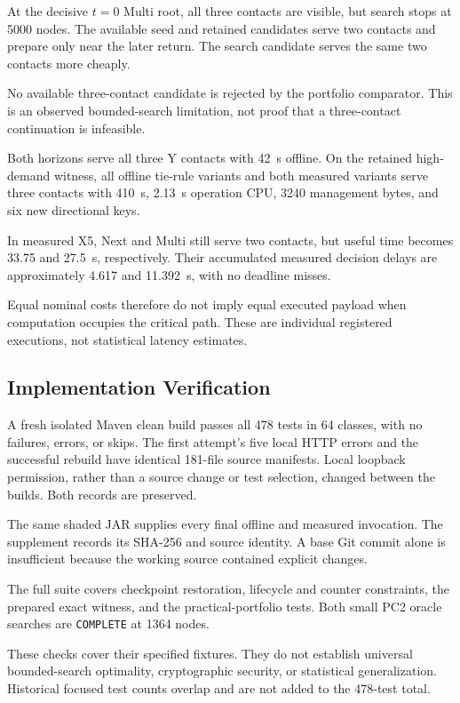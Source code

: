 \documentclass[conference]{IEEEtran}
\newcommand{\op}[1]{\texttt{#1}}
\begin{document}
At the decisive $t=0$ Multi root, all three contacts are visible,
but search stops at 5000 nodes.
The available seed and retained candidates serve two contacts
and prepare only near the later return.
The search candidate serves the same two contacts more cheaply.

No available three-contact candidate is rejected by the portfolio
comparator.
This is an observed bounded-search limitation, not proof that
a three-contact continuation is infeasible.

Both horizons serve all three Y contacts with 42~s offline.
On the retained high-demand witness, all offline tie-rule
variants and both measured variants serve three contacts with
410~s, 2.13~s operation CPU, 3240 management bytes,
and six new directional keys.

In measured X5, Next and Multi still serve two contacts,
but useful time becomes 33.75 and 27.5~s, respectively.
Their accumulated measured decision delays are approximately
4.617 and 11.392~s, with no deadline misses.

Equal nominal costs therefore do not imply equal executed
payload when computation occupies the critical path.
These are individual registered executions, not statistical
latency estimates.

\subsection{Implementation Verification}

A fresh isolated Maven clean build passes all 478 tests in
64 classes, with no failures, errors, or skips.
The first attempt's five local HTTP errors and the successful
rebuild have identical 181-file source manifests.
Local loopback permission, rather than a source change or
test selection, changed between the builds.
Both records are preserved.

The same shaded JAR supplies every final offline and measured
invocation.
The supplement records its SHA-256 and source identity.
A base Git commit alone is insufficient because the working
source contained explicit changes.

The full suite covers checkpoint restoration, lifecycle and
counter constraints, the prepared exact witness, and the
practical-portfolio tests.
Both small PC2 oracle searches are \op{COMPLETE} at
1364 nodes.

These checks cover their specified fixtures.
They do not establish universal bounded-search optimality,
cryptographic security, or statistical generalization.
Historical focused test counts overlap and are not added
to the 478-test total.
\end{document}
